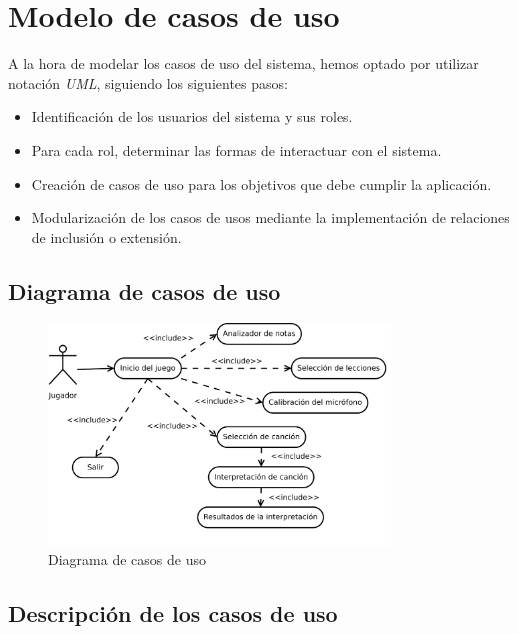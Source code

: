 \section{Modelo de casos de uso}

A la hora de modelar los casos de uso del sistema, hemos optado por utilizar
notación \textit{UML}, siguiendo los siguientes pasos:
\begin{itemize}
\item Identificación de los usuarios del sistema y sus roles.
\item Para cada rol, determinar las formas de interactuar con el sistema.
\item Creación de casos de uso para los objetivos que debe cumplir la aplicación.
\item Modularización de los casos de usos mediante la implementación de
  relaciones de inclusión o extensión.
\end{itemize}

\subsection{Diagrama de casos de uso}

\begin{figure}[h!]
  \centering
  \includegraphics[width=0.81\textwidth]{4_analisis/imagen_diagrama_de_casos_de_uso}
  \caption{Diagrama de casos de uso}
\end{figure}


\subsection{Descripción de los casos de uso}


